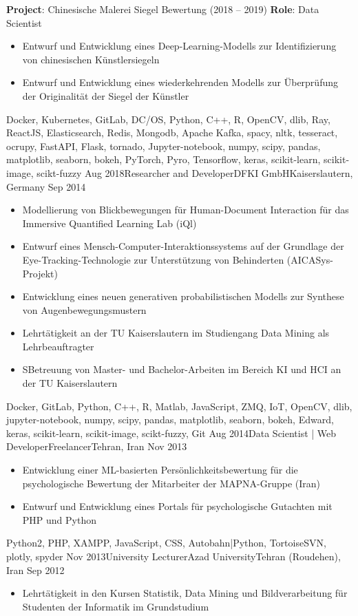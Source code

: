 \begin{experiences}
{    \textbf{Project}: Chinesische Malerei Siegel Bewertung (2018 -- 2019)\newline
    \textbf{Role}: Data Scientist
    \begin{itemize}
      \item Entwurf und Entwicklung eines Deep-Learning-Modells zur Identifizierung von chinesischen Künstlersiegeln
      \item Entwurf und Entwicklung eines wiederkehrenden Modells zur Überprüfung der Originalität der Siegel der Künstler
    \end{itemize}
  }
  {Docker, Kubernetes, GitLab, DC/OS, Python, C++, R,  OpenCV, dlib, Ray, ReactJS, Elasticsearch, Redis, Mongodb, Apache Kafka, spacy, nltk, tesseract, ocrupy, FastAPI, Flask, tornado, Jupyter-notebook, numpy, scipy, pandas, matplotlib, seaborn, bokeh, PyTorch, Pyro, Tensorflow, keras, scikit-learn, scikit-image, scikt-fuzzy}
  \emptySeparator
  \experience
  {Aug 2018}{Researcher and Developer}{DFKI GmbH}{Kaiserslautern, Germany}
  {Sep 2014} {
    \begin{itemize}
      \item Modellierung von Blickbewegungen für Human-Document Interaction für das Immersive Quantified Learning Lab (iQl)
      \item Entwurf eines Mensch-Computer-Interaktionssystems auf der Grundlage der Eye-Tracking-Technologie zur Unterstützung von Behinderten (AICASys-Projekt)
      \item Entwicklung eines neuen generativen probabilistischen Modells zur Synthese von Augenbewegungsmustern
      \item Lehrtätigkeit an der TU Kaiserslautern im Studiengang Data Mining als Lehrbeauftragter
      \item SBetreuung von Master- und Bachelor-Arbeiten im Bereich KI und HCI an der TU Kaiserslautern

    \end{itemize}
  }
  {Docker, GitLab, Python, C++, R, Matlab, JavaScript, ZMQ, IoT, OpenCV, dlib, jupyter-notebook, numpy, scipy, pandas, matplotlib, seaborn, bokeh, Edward, keras, scikit-learn, scikit-image, scikt-fuzzy, Git}
  \emptySeparator
  \experience
  {Aug 2014}{Data Scientist | Web Developer}{Freelancer}{Tehran, Iran}
  {Nov 2013} {
    \begin{itemize}
      \item Entwicklung einer ML-basierten Persönlichkeitsbewertung für die psychologische Bewertung der Mitarbeiter der MAPNA-Gruppe (Iran)
      \item Entwurf und Entwicklung eines Portals für psychologische Gutachten mit PHP und Python
    \end{itemize}
  }
  {Python2, PHP, XAMPP, JavaScript, CSS, Autobahn|Python, TortoiseSVN, plotly, spyder}
  \emptySeparator
  \experience
  {Nov 2013}{University Lecturer}{Azad University}{Tehran (Roudehen), Iran}
  {Sep 2012} {
    \begin{itemize}
      \item Lehrtätigkeit in den Kursen Statistik, Data Mining und Bildverarbeitung für Studenten der Informatik im Grundstudium


\end{itemize}}
\end{experiences}
